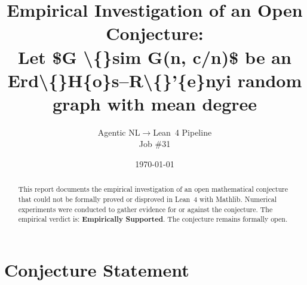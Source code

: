 \documentclass[11pt]{article}
\title{Empirical Investigation of an Open Conjecture:\\
Let \$G \textbackslash\{\}sim G(n, c/n)\$ be an Erd\textbackslash\{\}H\{o\}s--R\textbackslash\{\}'\{e\}nyi random graph with mean degree }
\author{Agentic NL$\to$Lean~4 Pipeline \\ \small Job \#31}
\date{\today}
\begin{document}
\maketitle

\begin{abstract}
This report documents the empirical investigation of an open mathematical conjecture
that could not be formally proved or disproved in Lean~4 with Mathlib.
Numerical experiments were conducted to gather evidence for or against the conjecture.
The empirical verdict is: \textbf{\textcolor{green!70!black}{Empirically Supported}}.
The conjecture remains formally open.
\end{abstract}

\section{Conjecture Statement}
\end{document}
